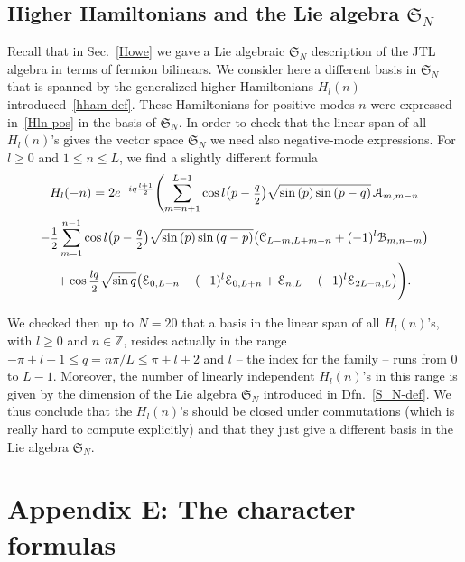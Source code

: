 \documentclass[11pt]{article}
\renewcommand{\theequation}{\thesection.\arabic{equation}}
\newcommand{\ffrac}[2]{\mbox{\footnotesize$\displaystyle\frac{#1}{#2}$}}
\newcommand{\half}{%
  \mathchoice{\ffrac{1}{2}}{\frac{1}{2}}{\frac{1}{2}}{\frac{1}{2}}}
\newcommand{\oZ}{\mathbb{Z}}
\newcommand{\interLie}{\mathfrak{S}}
\newcommand{\interfin}[1]{\interLie_{#1}}
\newcommand{\Asp}{\mathcal{A}}
\newcommand{\Bsp}{\mathcal{B}}
\newcommand{\Csp}{\mathcal{C}}
\newcommand{\Egl}{\mathcal{E}}
\theoremstyle{definition}
\begin{document}
\subsection{Higher Hamiltonians and the Lie algebra $\interfin{N}$}\label{app:Hln-Sn}
Recall that  in Sec.~\ref{Howe} we gave  a Lie algebraic $\interfin{N}$ description of the JTL algebra in terms of fermion bilinears.
We consider here  a different basis in $\interfin{N}$ that is spanned by the generalized higher Hamiltonians $H_l(n)$ introduced~\eqref{hham-def}.
These Hamiltonians for positive modes $n$ were expressed in~\eqref{Hln-pos} in the basis of $\interfin{N}$. In order to check that the linear span of all $H_l(n)$'s gives the vector space $\interfin{N}$ we need also negative-mode expressions. For $l\geq0$ and $1\leq n\leq L$, we
find a slightly different formula
\begin{multline}\label{Hln-neg}
H_l(-n) =
2e^{-iq\frac{l+1}{2}}\Biggl( \sum_{m=n+1}^{L-1}
\cos{l\bigl(p-\ffrac{q}{2}\bigr)}\sqrt{\sin{(p)}\sin{(p-q)}}\, \Asp_{m,m-n}\\
-\half\sum_{m=1}^{n-1}
\cos{l\bigl(p-\ffrac{q}{2}\bigr)}\sqrt{\sin{(p)}\sin{(q-p)}}\bigl(\Csp_{L-m,L+m-n}
+(-1)^l \Bsp_{m,n-m}\bigr)\\
+\cos{\ffrac{lq}{2}}\sqrt{\sin{q}}\bigl(\Egl_{0,L-n} - (-1)^l \Egl_{0,L+n} + \Egl_{n,L} -
 (-1)^l\Egl_{2L-n,L} \bigr) \Biggr).
\end{multline}

We checked then up to $N=20$ that a basis in the linear span of all $H_l(n)$'s, with $l\geq0$ and $n\in\oZ$,  resides  actually in the range $-\pi + l +1\leq q = n\pi/L \leq \pi + l + 2$ and $l$ -- the index for the family -- runs from $0$ to $L-1$. Moreover, the number of linearly independent $H_l(n)$'s in this range is given by the dimension of the Lie algebra $\interfin{N}$ introduced in Dfn.~\ref{S_N-def}. We thus conclude that the $H_l(n)$'s should be closed under commutations (which is really hard to compute explicitly) and that they  just give  a different basis in the Lie algebra $\interfin{N}$.




\section*{Appendix E: The character formulas}
\renewcommand\thesection{E}
\renewcommand{\theequation}{E\arabic{equation}}
\setcounter{equation}{0}
\end{document}
